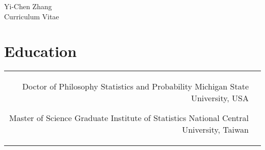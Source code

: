 \documentclass[10pt]{article} %
\begin{document}
\begin{paracol}{2} %


  \parbox[top][0.08\textheight][c]{\linewidth}{ %
    \vspace{-0.02\textheight} %
    \centering %
    {\sffamily\Huge Yi-Chen Zhang}\\%
    {\Huge\color{headings}\cvtextfont Curriculum Vitae}
  }


  \section{Education} 





  \begin{supertabular}{rl} %


    {Doctor of Philosophy} %
    {} %
    {Statistics and Probability} %
    {Michigan State University, USA} %


    {Master of Science} %
    {} %
    {Graduate Institute of Statistics} %
    {National Central University, Taiwan} %


\end{supertabular}
\end{paracol}
\end{document}
